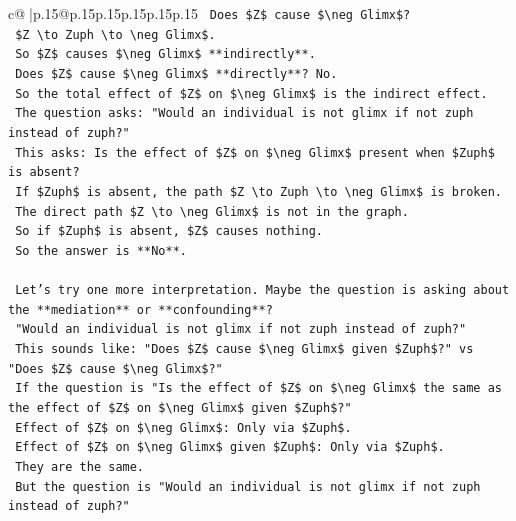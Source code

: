 \documentclass{article}
\begin{document}
{\begin{supertabular}{c@{$\;$}|p{.15\linewidth}@{}p{.15\linewidth}p{.15\linewidth}p{.15\linewidth}p{.15\linewidth}p{.15\linewidth}}
{{{\texttt{    Does \$Z\$ cause \$\textbackslash{}neg Glimx\$?} \\
\texttt{    \$Z \textbackslash{}to Zuph \textbackslash{}to \textbackslash{}neg Glimx\$.} \\
\texttt{    So \$Z\$ causes \$\textbackslash{}neg Glimx\$ **indirectly**.} \\
\texttt{    Does \$Z\$ cause \$\textbackslash{}neg Glimx\$ **directly**? No.} \\
\texttt{    So the total effect of \$Z\$ on \$\textbackslash{}neg Glimx\$ is the indirect effect.} \\
\texttt{    The question asks: "Would an individual is not glimx if not zuph instead of zuph?"} \\
\texttt{    This asks: Is the effect of \$Z\$ on \$\textbackslash{}neg Glimx\$ present when \$Zuph\$ is absent?} \\
\texttt{    If \$Zuph\$ is absent, the path \$Z \textbackslash{}to Zuph \textbackslash{}to \textbackslash{}neg Glimx\$ is broken.} \\
\texttt{    The direct path \$Z \textbackslash{}to \textbackslash{}neg Glimx\$ is not in the graph.} \\
\texttt{    So if \$Zuph\$ is absent, \$Z\$ causes nothing.} \\
\texttt{    So the answer is **No**.} \\
\\ 
\texttt{    Let's try one more interpretation. Maybe the question is asking about the **mediation** or **confounding**?} \\
\texttt{    "Would an individual is not glimx if not zuph instead of zuph?"} \\
\texttt{    This sounds like: "Does \$Z\$ cause \$\textbackslash{}neg Glimx\$ given \$Zuph\$?" vs "Does \$Z\$ cause \$\textbackslash{}neg Glimx\$?"} \\
\texttt{    If the question is "Is the effect of \$Z\$ on \$\textbackslash{}neg Glimx\$ the same as the effect of \$Z\$ on \$\textbackslash{}neg Glimx\$ given \$Zuph\$?"} \\
\texttt{    Effect of \$Z\$ on \$\textbackslash{}neg Glimx\$: Only via \$Zuph\$.} \\
\texttt{    Effect of \$Z\$ on \$\textbackslash{}neg Glimx\$ given \$Zuph\$: Only via \$Zuph\$.} \\
\texttt{    They are the same.} \\
\texttt{    But the question is "Would an individual is not glimx if not zuph instead of zuph?"} \\
}}}
\end{supertabular}}
\end{document}
